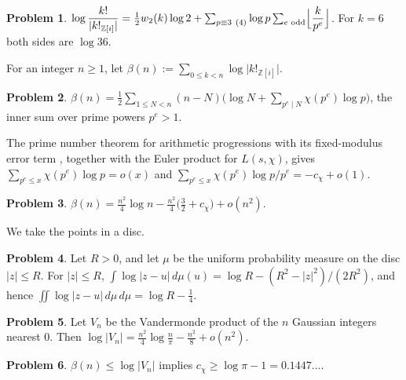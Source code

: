 \documentclass[reqno]{amsart}
\theoremstyle{definition}
\newtheorem{problem}{Problem}[section]
\theoremstyle{plain}
\newcommand{\Z}{\mathbb{Z}}
\newcommand{\Zi}{\Z[i]}
\begin{document}
\begin{problem}\label{pr:bhargava}
\(\log \dfrac{k!}{\lvert k!_{\Zi} \rvert} = \frac12 w_2(k) \log 2 + \sum_{p \equiv 3 \ (4)} \log p \sum_{e \text{ odd}} \Bigl\lfloor \dfrac{k}{p^e} \Bigr\rfloor\).  For \(k = 6\) both sides are \(\log 36\).
\end{problem}

For an integer \(n\ge 1\), let \(\beta(n):=\sum_{0\le k<n}\log\lvert k!_{\Zi}\rvert\).

\begin{problem}\label{pr:beta-sum}
\(\beta(n) = \frac12 \sum_{1 \le N < n} (n - N) \bigl( \log N + \sum_{p^e \mid N} \chi(p^e) \log p \bigr)\), the inner sum over prime powers \(p^e > 1\).
\end{problem}

The prime number theorem for arithmetic progressions with its fixed-modulus error term \cite[\S11.3]{MV}, together with the Euler product for \(L(s,\chi)\), gives \(\sum_{p^e \le x} \chi(p^e) \log p = o(x)\) and \(\sum_{p^e \le x} \chi(p^e) \log p / p^e = -c_\chi + o(1)\).

\begin{problem}\label{pr:beta}
\(\beta(n) = \frac{n^2}4 \log n - \frac{n^2}{4}\bigl(\frac32 + c_\chi\bigr) + o(n^2)\).
\end{problem}

We take the points in a disc.

\begin{problem}\label{pr:disc}
Let \(R > 0\), and let \(\mu\) be the uniform probability measure on the disc \(\lvert z \rvert \le R\).  For \(\lvert z \rvert \le R\), \(\int \log\lvert z - u \rvert \, d\mu(u) = \log R - (R^2 - \lvert z \rvert^2)/(2R^2)\), and hence \(\iint \log\lvert z - u \rvert \, d\mu \, d\mu = \log R - \frac14\).
\end{problem}

\begin{problem}\label{pr:Vn}
Let \(V_n\) be the Vandermonde product of the \(n\) Gaussian integers nearest \(0\).  Then \(\log\lvert V_n \rvert = \frac{n^2}{4} \log\frac n\pi - \frac{n^2}8 + o(n^2)\).
\end{problem}

\begin{problem}\label{pr:ell-lower}
\(\beta(n) \le \log\lvert V_n \rvert\) implies \(c_\chi \ge \log\pi - 1 = 0.1447\ldots\).
\end{problem}
\end{document}
